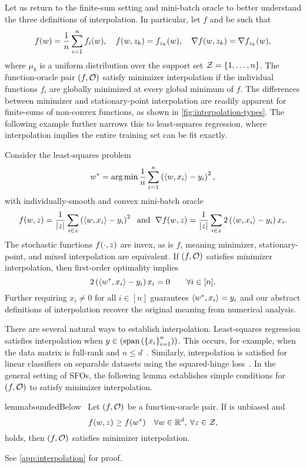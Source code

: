 Let us return to the finite-sum setting and mini-batch oracle to better understand the three definitions of interpolation.
In particular, let \( f \) and \oracle{} be such that
\[ f(\w) =  \frac{1}{n} \sum_{i=1}^{n} f_i(\w), \quad f(\w, \zk) = f_{\zk}(\w), \quad \grad(\w, \zk) = \grad_{\zk}(\w),  \]
where \( \mu_k \) is a uniform distribution over the support set \( \calZ = \cbr{1, \ldots, n} \).
The function-oracle pair \( \rbr{f, \oracle{}} \) satisfy minimizer interpolation if the individual functions \( f_i \) are globally minimized at every global minimum of \( f \).
The differences between minimizer and stationary-point interpolation are readily apparent for finite-sums of non-convex functions, as shown in \autoref{fig:interpolation-types}.
The following example further narrows this to least-squares regression, where interpolation implies the entire training set can be fit exactly.
\begin{example}\label{example:ls-interpolation}
    Consider the least-squares problem 
    \[ \wopt = \argmin \frac{1}{n} \sum_{i=1}^n \rbr{\abr{w, x_i} - y_i}^2, \]
    with individually-smooth and convex mini-batch oracle
    \[ f(\w, \z) = \frac{1}{|\z|} \sum_{i \in \z}  \rbr{\abr{w, x_i} - y_i}^2 \; \text{ and } \; \grad(\w, \z) = \frac{1}{|\z|} \sum_{i \in \z} 2 \rbr{\abr{w, x_i} - y_i} x_i. \]
    The stochastic functions \( f(\cdot, \z) \) are invex, as is \( f \), meaning minimizer, stationary-point, and mixed interpolation are equivalent. 
    If \( \rbr{f, \oracle} \) satisfies minimizer interpolation, then first-order optimality implies 
    \[  2 \rbr{\abr{\wopt, x_i} - y_i} x_i = 0 \quad \quad \forall i \in [n]. \] 
    Further requiring \( x_i \neq 0 \) for all \( i \in [n] \) guarantees \( \abr{\wopt, x_i} = y_i \) and our abstract definitions of interpolation recover the original meaning from numerical analysis.  
\end{example}

There are several natural ways to establish interpolation.
Least-squares regression satisfies interpolation when \( y \in \rbr{\text{span}\rbr{\cbr{x_i}_{i=1}^n}} \). 
This occurs, for example, when the data matrix is full-rank and \( n \leq d \)~\citep{hastie2009elements}.
Similarly, interpolation is satisfied for linear classifiers on separable datasets using the squared-hinge loss~\citep{vaswani2019fast}. 
In the general setting of \acp{SFO}, the following lemma establishes simple conditions for \( \rbr{f, \oracle{}} \) to satisfy minimizer interpolation.
\begin{restatable}{lemma}{boundedBelow}~\label{lemma:bounded-below}
    Let \( \rbr{f, \oracle{}} \) be a function-oracle pair. 
    If \oracle{} is unbiased and 
    \[ f(\w, \z ) \geq f(\wopt) \quad \forall \w \in \R^d, \: \forall \z \in \calZ, \]
    holds, then \( \rbr{f,\oracle{}} \) satisfies minimizer interpolation.
\end{restatable}
\noindent See \autoref{app:interpolation} for proof.\hfill \break

